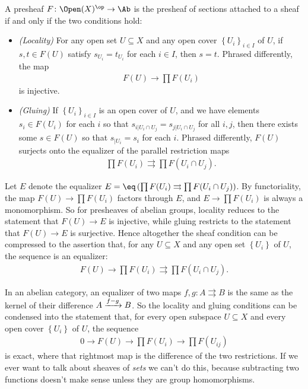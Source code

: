 \documentclass[11pt]{book}
\begin{document}
\begin{theorem} A presheaf $F \colon \Open(X)^\op \to \Ab$ is the presheaf of sections attached to a sheaf if and only if the two conditions hold:
\begin{itemize}
    \item[\textbf{Sh1}] \textit{(Locality)} For any open set $U \subseteq X$ and any open cover $\left\{ U_i \right\}_{i\in I}$ of $U$, if $s,t\in F(U)$ satisfy $s_{U_i} = t_{U_i}$ for each $i \in I$, then $s=t$. Phrased differently, the map
    \begin{align*}
        F(U) \to \prod F(U_i)
    \end{align*}
    is injective.

    \item[\textbf{Sh2}] \textit{(Gluing)} If $\left\{ U_i \right\}_{i\in I}$ is an open cover of $U$, and we have elements $s_i \in F(U_i)$ for each $i$ so that $s_{i|U_i\cap U_j} = s_{j|U_i\cap U_j}$ for all $i,j$, then there exists some $s\in F(U)$ so that $s_{|U_i} = s_i$ for each $i$. Phrased differently, $F(U)$ surjects onto the equalizer of the parallel restriction maps
    \begin{align*}
        \prod F(U_i) \rightrightarrows \prod F(U_i\cap U_j).
    \end{align*}
\end{itemize}
\end{theorem}

\begin{remark} Let $E$ denote the equalizer $E = \eq \left( \prod F(U_i) \rightrightarrows \prod F(U_i\cap U_j) \right)$. By functoriality, the map $F(U) \to \prod F(U_i)$ factors through $E$, and $E \to \prod F(U_i)$ is always a monomorphism. So for presheaves of abelian groups, locality reduces to the statement that $F(U) \to E$ is injective, while gluing restricts to the statement that $F(U) \to E$ is surjective. Hence altogether the sheaf condition can be compressed to the assertion that, for any $U \subseteq X$ and any open set $\left\{ U_i \right\}$ of $U$, the sequence is an equalizer:
\begin{align*}
    F(U) \to \prod F(U_i) \rightrightarrows \prod F(U_i\cap U_j).
\end{align*}
\end{remark}


\begin{remark} In an abelian category, an equalizer of two maps $f,g \colon A \rightrightarrows B$ is the same as the kernel of their difference $A \xrightarrow{f-g} B$. So the locality and gluing conditions can be condensed into the statement that, for every open subspace $U \subseteq X$ and every open cover $\left\{ U_i \right\}$ of $U$, the sequence
\begin{align*}
    0 \to F(U) \to \prod F(U_i) \to \prod F(U_{ij})
\end{align*}
is exact, where that rightmost map is the difference of the two restrictions. If we ever want to talk about sheaves of \emph{sets} we can't do this, because subtracting two functions doesn't make sense unless they are group homomorphisms.
\end{remark}
\end{document}
